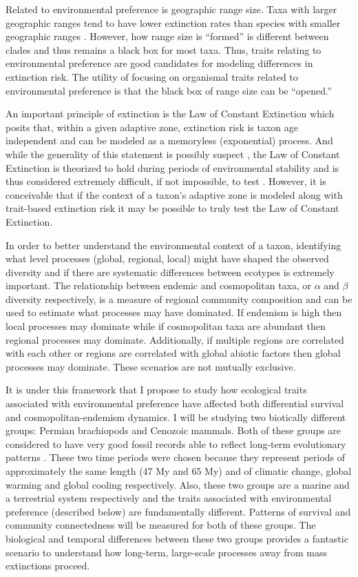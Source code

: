 \documentclass[12pt,letterpaper]{article}
\begin{document}
Related to environmental preference is geographic range size. Taxa with larger geographic ranges tend to have lower extinction rates than species with smaller geographic ranges \citep{Jablonski1986,Harnik2013,Nurnberg2013a,Jablonski2003,Roy2009c}. However, how range size is ``formed'' is different between clades \citep{Jablonski1987} and thus remains a black box for most taxa. Thus, traits relating to environmental preference are good candidates for modeling differences in extinction risk. The utility of focusing on organismal traits related to environmental preference is that the black box of range size can be ``opened.''

An important principle of extinction is the Law of Constant Extinction \citep{VanValen1973} which posits that, within a given adaptive zone, extinction risk is taxon age independent and can be modeled as a memoryless (exponential) process. And while the generality of this statement is possibly suspect \citep{Drake2014,Raup1975,Sepkoski1975,Finnegan2008,Raup1991a}, the Law of Constant Extinction is theorized to hold during periods of environmental stability and is thus considered extremely difficult, if not impossible, to test \citep{Liow2011a}. However, it is conceivable that if the context of a taxon's adaptive zone is modeled along with trait-based extinction risk it may be possible to truly test the Law of Constant Extinction.

In order to better understand the environmental context of a taxon, identifying what level processes (global, regional, local) might have shaped the observed diversity and if there are systematic differences between ecotypes is extremely important. The relationship between endemic and cosmopolitan taxa, or \(\alpha\) and \(\beta\) diversity respectively, is a measure of regional community composition and can be used to estimate what processes may have dominated. If endemism is high then local processes may dominate while if cosmopolitan taxa are abundant then regional processes may dominate. Additionally, if multiple regions are correlated with each other or regions are correlated with global abiotic factors then global processes may dominate. These scenarios are not mutually exclusive. 

It is under this framework that I propose to study how ecological traits associated with environmental preference have affected both differential survival and cosmopolitan-endemism dynamics. I will be studying two biotically different groups: Permian brachiopods and Cenozoic mammals. Both of these groups are considered to have very good fossil records able to reflect long-term evolutionary patterns \citep{Mark1977}. These two time periods were chosen because they represent periods of approximately the same length (47 My and 65 My) and of climatic change, global warming and global cooling respectively. Also, these two groups are a marine and a terrestrial system respectively and the traits associated with environmental preference (described below) are fundamentally different. Patterns of survival and community connectedness will be measured for both of these groups. The biological and temporal differences between these two groups provides a fantastic scenario to understand how long-term, large-scale processes away from mass extinctions proceed.
\end{document}
